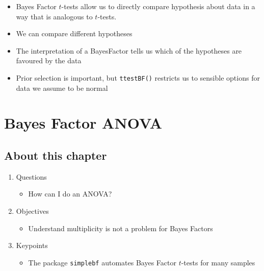 \documentclass[
]{book}
\providecommand{\tightlist}{%
  \setlength{\itemsep}{0pt}\setlength{\parskip}{0pt}}
\newenvironment{roundup}
{ \begin{tcolorbox}[colbacktitle=yellow!50!white,
title=Round Up,coltitle=black,
fonttitle=\bfseries] }
{  \end{tcolorbox} }
\begin{document}
\begin{roundup}
\begin{itemize}
\tightlist
\item
  Bayes Factor \(t\)-tests allow us to directly compare hypothesis about data in a way that is analogous to \(t\)-tests.
\item
  We can compare different hypotheses
\item
  The interpretation of a BayesFactor tells us which of the hypotheses are favoured by the data
\item
  Prior selection is important, but \texttt{ttestBF()} restricts us to sensible options for data we assume to be normal
\end{itemize}
\end{roundup}

\hypertarget{bayes-factor-anova}{%
\chapter{Bayes Factor ANOVA}\label{bayes-factor-anova}}

\hypertarget{about-this-chapter-3}{%
\section{About this chapter}\label{about-this-chapter-3}}

\begin{enumerate}
\def\labelenumi{\arabic{enumi}.}
\tightlist
\item
  Questions

  \begin{itemize}
  \tightlist
  \item
    How can I do an ANOVA?
  \end{itemize}
\item
  Objectives

  \begin{itemize}
  \tightlist
  \item
    Understand multiplicity is not a problem for Bayes Factors
  \end{itemize}
\item
  Keypoints

  \begin{itemize}
  \tightlist
  \item
    The package \texttt{simplebf} automates Bayes Factor \(t\)-tests for many samples
  \end{itemize}
\end{enumerate}
\end{document}
